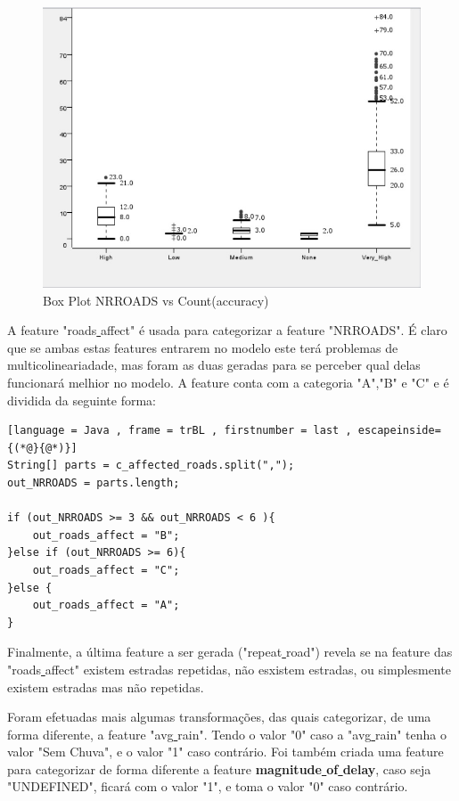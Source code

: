 \documentclass[a4paper,10pt]{article}
\begin{document}
\begin{figure} [ h! ]
  \centering
  \includegraphics[width=0.9\linewidth,scale=1.2]{imagens/bproads.jpg}
  \caption{Box Plot NRROADS vs Count(accuracy) }
  \label{fig:bproads}
\end{figure}

A feature "roads\underline{ }affect" é usada para categorizar a feature "NRROADS". É claro que se ambas estas features entrarem no modelo este terá problemas de multicolineariadade, mas foram as duas geradas para se perceber qual delas funcionará melhior no modelo. A feature conta com a categoria "A","B" e "C" e é dividida da seguinte forma: 

\begin{lstlisting}[language = Java , frame = trBL , firstnumber = last , escapeinside={(*@}{@*)}]
String[] parts = c_affected_roads.split(",");		
out_NRROADS = parts.length;
 
if (out_NRROADS >= 3 && out_NRROADS < 6 ){
	out_roads_affect = "B";
}else if (out_NRROADS >= 6){
	out_roads_affect = "C";
}else {
	out_roads_affect = "A";
}
\end{lstlisting}
Finalmente, a última feature a ser gerada ("repeat\underline{ }road") revela se na feature das "roads\underline{ }affect" existem estradas repetidas, não esxistem estradas, ou simplesmente existem estradas mas não repetidas. 

Foram efetuadas mais algumas transformações, das quais categorizar, de uma forma diferente,  a feature "avg\underline{ }rain". Tendo o valor "0" caso a "avg\underline{ }rain" tenha o valor "Sem Chuva", e o valor "1" caso contrário.  
Foi também criada uma feature para categorizar de forma diferente a feature \textbf{magnitude\underline{ }of\underline{ }delay}, caso seja "UNDEFINED", ficará com o valor "1", e toma o valor "0" caso contrário. 
\end{document}

